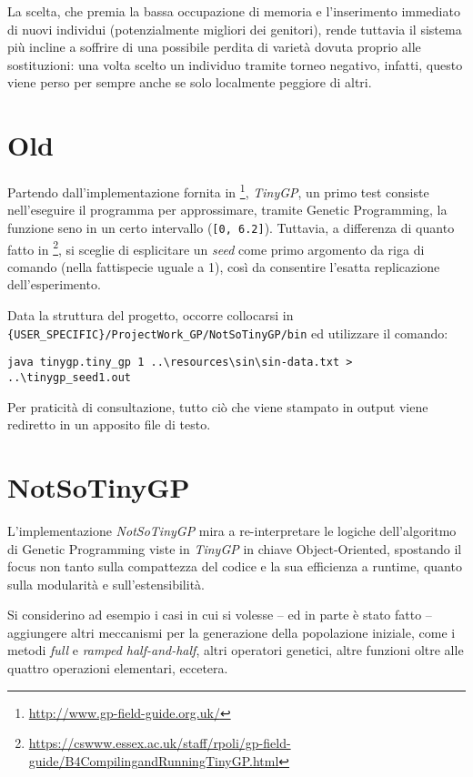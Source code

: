 \documentclass{../llncs}
\begin{document}
La scelta, che premia la bassa occupazione di memoria e l'inserimento immediato di nuovi individui (potenzialmente migliori dei genitori), rende tuttavia il sistema più incline a soffrire di una possibile perdita di varietà dovuta proprio alle sostituzioni: una volta scelto un individuo tramite torneo negativo, infatti, questo viene perso per sempre anche se solo localmente peggiore di altri.

\section{Old}
Partendo dall'implementazione fornita in \footnote{\url{http://www.gp-field-guide.org.uk/}}, \emph{TinyGP}, un primo test consiste nell'eseguire il programma per approssimare, tramite Genetic Programming, la funzione seno in un certo intervallo (\texttt{[0, 6.2]}). Tuttavia, a differenza di quanto fatto in \footnote{\url{https://cswww.essex.ac.uk/staff/rpoli/gp-field-guide/B4CompilingandRunningTinyGP.html}}, si sceglie di esplicitare un \emph{seed} come primo argomento da riga di comando (nella fattispecie uguale a 1), così da consentire l'esatta replicazione dell'esperimento.

Data la struttura del progetto, occorre collocarsi in \texttt{\{USER\_SPECIFIC\}/ProjectWork\_GP/NotSoTinyGP/bin} ed utilizzare il comando:
\begin{lstlisting}[caption={Esecuzione di TinyGP da riga di comando}]
java tinygp.tiny_gp 1 ..\resources\sin\sin-data.txt > ..\tinygp_seed1.out
\end{lstlisting}
Per praticità di consultazione, tutto ciò che viene stampato in output viene rediretto in un apposito file di testo.

\section{NotSoTinyGP}
L'implementazione \emph{NotSoTinyGP} mira a re-interpretare le logiche dell'algoritmo di Genetic Programming viste in \emph{TinyGP} in chiave Object-Oriented, spostando il focus non tanto sulla compattezza del codice e la sua efficienza a runtime, quanto sulla modularità e sull'estensibilità.

Si considerino ad esempio i casi in cui si volesse -- ed in parte è stato fatto -- aggiungere altri meccanismi per la generazione della popolazione iniziale, come i metodi \emph{full} e \emph{ramped half-and-half}, altri operatori genetici, altre funzioni oltre alle quattro operazioni elementari, eccetera.\\
\end{document}
